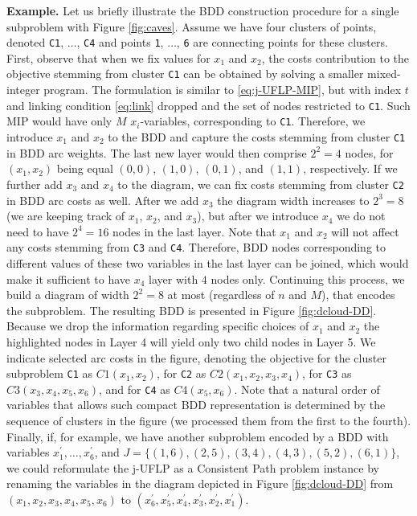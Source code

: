 \documentclass[11pt]{article}
\begin{document}
\textbf{\textbf{Example.}} Let us briefly illustrate the BDD construction procedure for a
single subproblem with Figure \ref{fig:caves}. Assume we have four clusters of
points, denoted \texttt{C1}, \(\ldots\), \texttt{C4} and points \texttt{1}, \(\ldots\), \texttt{6} are
connecting points for these clusters. First, observe that when we fix values for
\(x_1\) and \(x_2\), the costs contribution to the objective stemming from cluster
\texttt{C1} can be obtained by solving a smaller mixed-integer program. The formulation
is similar to \eqref{eq:j-UFLP-MIP}, but with index \(t\) and linking condition
\eqref{eq:link} dropped and the set of nodes restricted to \texttt{C1}. Such MIP would
have only \(M\)  $x_i$-variables, corresponding to \texttt{C1}. Therefore, we
introduce \(x_1\) and \(x_2\) to the BDD and capture the costs stemming from cluster
\texttt{C1} in BDD arc weights. The last new layer would then comprise \(2^2=4\) nodes,
for \((x_1,x_2)\) being equal \((0,0)\), \((1,0)\), \((0,1)\), and \((1,1)\),
respectively. If we further add \(x_3\) and \(x_4\) to the diagram, we can fix costs
stemming from cluster \texttt{C2} in BDD arc costs as well. After we add \(x_3\) the
diagram width increases to \(2^3=8\) (we are keeping track of \(x_1\), \(x_2\), and
\(x_3\)), but after we introduce \(x_4\) we do not need to have \(2^4=16\) nodes in
the last layer. Note that \(x_1\) and \(x_2\) will not affect any costs stemming
from \texttt{C3} and \texttt{C4}. Therefore, BDD nodes corresponding to different values of
these two variables in the last layer can be joined, which would make it
sufficient to have \(x_4\) layer with \(4\) nodes only. Continuing this process, we
build a diagram of width \(2^2=8\) at most (regardless of \(n\) and \(M\)), that
encodes the subproblem. The resulting BDD is presented in Figure
\ref{fig:dcloud-DD}. Because we drop the information regarding specific choices of
\(x_1\) and \(x_2\) the highlighted nodes in Layer 4 will yield only two child nodes
in Layer 5. We indicate selected arc costs in the figure, denoting the objective
for the cluster subproblem \texttt{C1} as \(C1(x_1, x_2)\), for \texttt{C2} as \(C2(x_1, x_2,
x_3, x_4)\), for \texttt{C3} as \(C3(x_3, x_4, x_5, x_6)\), and for \texttt{C4} as \(C4(x_5,
x_6)\). Note that a natural order of variables that allows such compact BDD
representation is determined by the sequence of clusters in the figure (we
processed them from the first to the fourth). Finally, if, for example, we have
another subproblem encoded by a BDD with variables \(x_1^\prime, \ldots,
x_6^\prime\), and \(J=\{(1,6), (2,5), (3,4), (4,3), (5,2), (6,1)\}\), we could
reformulate the j-UFLP as a Consistent Path problem instance by renaming the
variables in the diagram depicted in Figure \ref{fig:dcloud-DD} from \((x_1, x_2,
x_3, x_4, x_5, x_6)\) to \((x^\prime_6, x^\prime_5, x^\prime_4, x^\prime_3,
x^\prime_2, x^\prime_1)\).
\end{document}
